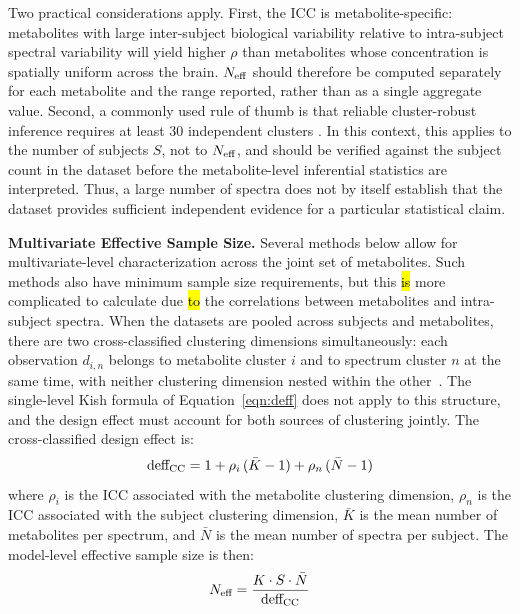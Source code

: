 Two practical considerations apply. First, the ICC is metabolite-specific: metabolites with large inter-subject biological variability relative to intra-subject spectral variability will yield higher $\rho$ than metabolites whose concentration is spatially uniform across the brain. $N_{\textnormal{eff}}$ should therefore be computed separately for each metabolite and the range reported, rather than as a single aggregate value. Second, a commonly used rule of thumb is that reliable cluster-robust inference requires at least 30 independent clusters \cite{Cameron2008}. In this context, this applies to the number of subjects $S$, not to $N_{\textnormal{eff}}$, and should be verified against the subject count in the dataset before the metabolite-level inferential statistics are interpreted. Thus, a large number of spectra does not by itself establish that the dataset provides sufficient independent evidence for a particular statistical claim.

\textbf{Multivariate Effective Sample Size.} Several methods below allow for multivariate-level characterization across the joint set of metabolites. Such methods also have minimum sample size requirements, but this \hl{is} more complicated to calculate due \hl{to} the correlations between metabolites and intra-subject spectra. When the datasets are pooled across subjects and metabolites, there are two cross-classified clustering dimensions simultaneously: each observation $d_{i,n}$ belongs to metabolite cluster $i$ and to spectrum cluster $n$ at the same time, with neither clustering dimension nested within the other~\cite{Raudenbush2002}. The single-level Kish formula of Equation~\ref{eqn:deff} does not apply to this structure, and the design effect must account for both sources of clustering jointly. The cross-classified design effect is:
\begin{equation}\label{eqn:deff_cc}
    \textnormal{deff}_{\textnormal{CC}} =
        1 + \rho_i\,(\bar{K} - 1) + \rho_n\,(\bar{N} - 1)
\end{equation}
\noindent where $\rho_i$ is the ICC associated with the metabolite clustering dimension, $\rho_n$ is the ICC associated with the subject clustering dimension, $\bar{K}$ is the mean number of metabolites per spectrum, and $\bar{N}$ is the mean number of spectra per subject. The model-level effective sample size is then:
\begin{equation}\label{eqn:neff_cc}
    N_{\textnormal{eff}} = \frac{K \cdot S \cdot \bar{N}}
                            {\textnormal{deff}_{\textnormal{CC}}}
\end{equation}

